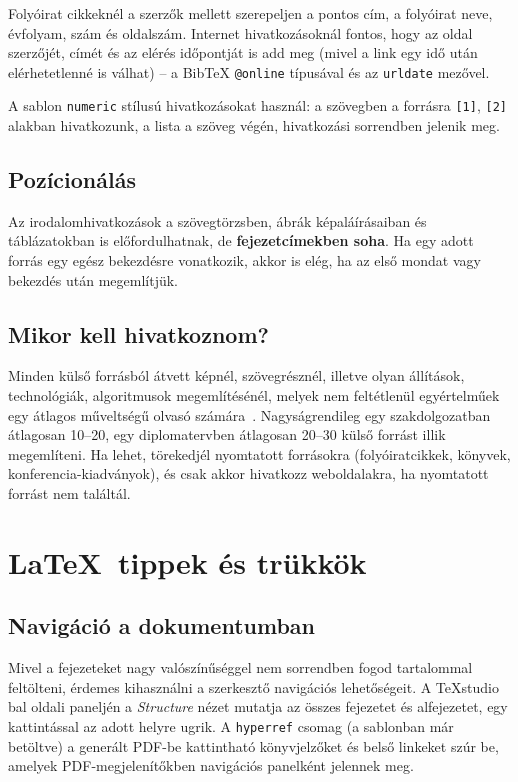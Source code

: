 Folyóirat cikkeknél a szerzők mellett szerepeljen a pontos cím, a folyóirat
neve, évfolyam, szám és oldalszám. Internet hivatkozásoknál fontos, hogy az
oldal szerzőjét, címét és az elérés időpontját is add meg (mivel a link egy
idő után elérhetetlenné is válhat) -- a BibTeX \texttt{@online} típusával és
az \texttt{urldate} mezővel.

A sablon \texttt{numeric} stílusú hivatkozásokat használ: a szövegben a
forrásra \texttt{[1]}, \texttt{[2]} alakban hivatkozunk, a lista a szöveg
végén, hivatkozási sorrendben jelenik meg.

\subsection{Pozícionálás}

Az irodalomhivatkozások a szövegtörzsben, ábrák képaláírásaiban és
táblázatokban is előfordulhatnak, de \textbf{fejezetcímekben soha}. Ha egy
adott forrás egy egész bekezdésre vonatkozik, akkor is elég, ha az első mondat
vagy bekezdés után megemlítjük.

\subsection{Mikor kell hivatkoznom?}

Minden külső forrásból átvett képnél, szövegrésznél, illetve olyan
állítások, technológiák, algoritmusok megemlítésénél, melyek nem feltétlenül
egyértelműek egy átlagos műveltségű olvasó számára~\cite{Hop95}.
Nagyságrendileg egy szakdolgozatban átlagosan 10--20, egy diplomatervben
átlagosan 20--30 külső forrást illik megemlíteni. Ha lehet, törekedjél
nyomtatott forrásokra (folyóiratcikkek, könyvek, konferencia-kiadványok), és
csak akkor hivatkozz weboldalakra, ha nyomtatott forrást nem találtál.

\section{\LaTeX\ tippek és trükkök}

\subsection{Navigáció a dokumentumban}

Mivel a fejezeteket nagy valószínűséggel nem sorrendben fogod tartalommal
feltölteni, érdemes kihasználni a szerkesztő navigációs lehetőségeit. A
TeXstudio bal oldali paneljén a \textit{Structure} nézet mutatja az összes
fejezetet és alfejezetet, egy kattintással az adott helyre ugrik. A
\texttt{hyperref} csomag (a sablonban már betöltve) a generált PDF-be kattintható
könyvjelzőket és belső linkeket szúr be, amelyek PDF-megjelenítőkben
navigációs panelként jelennek meg.

